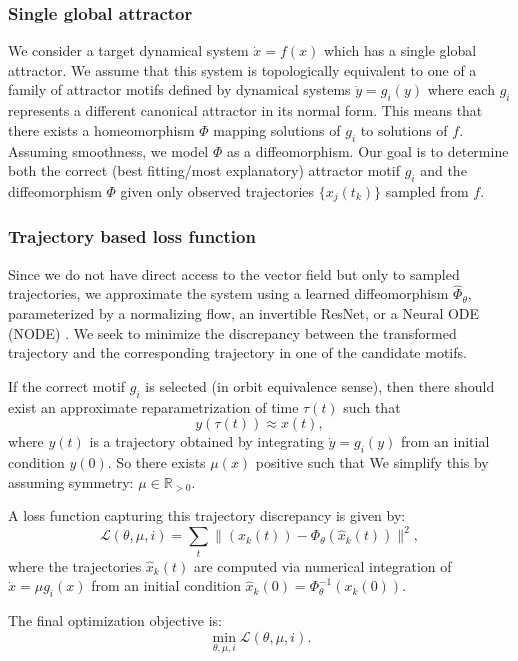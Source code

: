\documentclass{article}
\theoremstyle{definition} \newtheorem{definition}{Definition}  \newtheorem{example}{Example}
\theoremstyle{remark} \newtheorem{remark}{Remark}
\newcommand{\reals}{\mathbb{R}}
\newcounter{ct}
\begin{document}
\subsubsection{Single global attractor}
We consider a target dynamical system $\dot{x} = f(x)$ which has a single global attractor.
 We assume that this system is topologically equivalent to one of a family of attractor motifs defined by dynamical systems $\dot{y} = g_i(y)$ where each $g_i$ represents a different canonical attractor in its normal form.
  This means that there exists a homeomorphism $\Phi$ mapping solutions of $g_i$ to solutions of $f$.
  Assuming smoothness, we model $\Phi$ as a diffeomorphism.
Our goal is to determine both the correct (best fitting/most explanatory) attractor motif $g_i$ and the diffeomorphism $\Phi$ given only observed trajectories $\{x_j(t_k)\}$ sampled from $f$.


\subsubsection{Trajectory based loss function}
Since we do not have direct access to the vector field but only to sampled trajectories, we approximate the system using a learned diffeomorphism \( \hat{\Phi}_\theta \), parameterized by a normalizing flow\citep{kobyzev2020normalizing,papamakarios2021normalizing}, an invertible ResNet\citep{he2016deep}, or a Neural ODE (NODE) \citep{chen2018neural}.
 We seek to minimize the discrepancy between the transformed trajectory and the corresponding trajectory in one of the candidate motifs.

 If the correct motif \( g_i \) is selected (in orbit equivalence sense), then there should exist an approximate reparametrization of time \( \tau(t) \) such that
\[
y(\tau(t)) \approx x(t),
\]
where \( y(t) \) is a trajectory obtained by integrating \( \dot{y} = g_i(y) \) from an initial condition \( y(0) \). 
So there exists $\mu(x)$ positive such that 
We simplify this by assuming symmetry: $\mu\in\reals_{>0}$.


A loss function capturing this trajectory discrepancy is given by:
\[
\mathcal{L}(\theta, \mu, i) = \sum_{t} \Big\| (x_k(t)) - \Phi_\theta(\hat{x}_k(t)) \Big\|^2,
\]
where the trajectories \( \hat{x}_k(t) \) are computed via numerical integration of \(\dot x = \mu g_i(x) \) from an initial condition $\hat x_k(0) = \Phi_\theta^{-1}(x_k(0))$.

The final optimization objective is:
\[
\min_{\theta, \mu,  i} \mathcal{L}(\theta, \mu, i). %
\]
\end{document}
